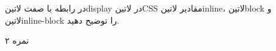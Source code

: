 \documentclass[../main.tex]{subfiles}
\begin{document}

در رابطه با صفت ‌لاتین{display} در ‌لاتین{CSS} مقادیر ‌لاتین{inline}، ‌لاتین{block} و ‌لاتین{inline-block} را توضیح دهید.

۲ نمره
\end{document}
